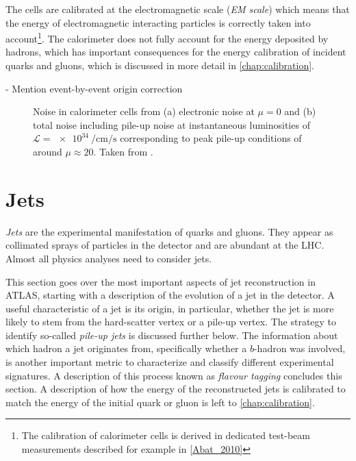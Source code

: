 The cells are calibrated at the electromagnetic scale (\emph{EM scale}) which means that the energy of electromagnetic interacting particles is correctly taken into account\footnote{The calibration of calorimeter cells is derived in dedicated test-beam measurements described for example in \cref{Abat_2010}}. The calorimeter does not fully account for the energy deposited by hadrons, which has important consequences for the energy calibration of incident quarks and gluons, which is discussed in more detail in \cref{chap:calibration}.

- Mention event-by-event origin correction


\begin{figure}
        
    \caption{Noise in calorimeter cells from (a) electronic noise at $\mu=0$ and (b) total noise including pile-up noise at instantaneous luminosities of $\mathcal{L} = \SI{e34}{\per\cm\per\s}$ corresponding to peak pile-up conditions of around $\mu\approx20$. Taken from .}
\end{figure}


\section{Jets}
\emph{Jets} are the experimental manifestation of quarks and gluons.
They appear as collimated sprays of particles in the detector and are abundant at the LHC.
Almost all physics analyses need to consider jets.

This section goes over the most important aspects of jet reconstruction in ATLAS, starting with a description of the evolution of a jet in the detector.
A useful characteristic of a jet is its origin, in particular, whether the jet is more likely to stem from the hard-scatter vertex or a pile-up vertex. The strategy to identify so-called \emph{pile-up jets} is discussed further below.
The information about which hadron a jet originates from, specifically whether a $b$-hadron was involved, is another important metric to characterize and classify different experimental signatures. A description of this process known as \emph{flavour tagging} concludes this section.
A description of how the energy of the reconstructed jets is calibrated to match the energy of the initial quark or gluon is left to \cref{chap:calibration}.


